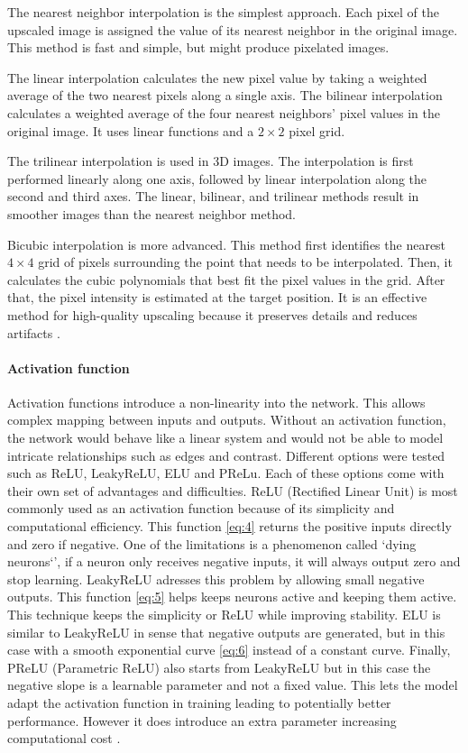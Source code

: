 \documentclass[twocolumn]{article}
\begin{document}
The nearest neighbor interpolation is the simplest approach. 
Each pixel of the upscaled image is assigned the value of its nearest neighbor in the original image. 
This method is fast and simple, but might produce pixelated images.

The linear interpolation calculates the new pixel value by taking a weighted average of the two nearest pixels along a single axis. 
The bilinear interpolation calculates a weighted average of the four nearest neighbors' pixel values in the original image. 
It uses linear functions and a $2 \times 2$ pixel grid. 

The trilinear interpolation is used in 3D images. 
The interpolation is first performed linearly along one axis, followed by linear interpolation along the second and third axes. 
The linear, bilinear, and trilinear methods result in smoother images than the nearest neighbor method.

Bicubic interpolation is more advanced. This method first identifies the nearest $4 \times 4$ grid of pixels surrounding the point that needs to be interpolated. 
Then, it calculates the cubic polynomials that best fit the pixel values in the grid. 
After that, the pixel intensity is estimated at the target position. 
It is an effective method for high-quality upscaling because it preserves details and reduces artifacts  \cite{unknown-author-2025} \cite{amanrao-2023}.

\paragraph{Activation function}
Activation functions introduce a non-linearity into the network. This allows complex mapping between inputs and outputs. 
Without an activation function, the network would behave like a linear system and would not be able to model intricate relationships such as edges and contrast. 
Different options were tested such as ReLU,  LeakyReLU, ELU and PReLu. Each of these options come with their own set of advantages and difficulties. 
ReLU (Rectified Linear Unit) is most commonly used as an activation function because of its simplicity and computational efficiency. 
This function \ref{eq:4} returns the positive inputs directly and zero if negative. One of the limitations is a phenomenon called `dying neurons`',  if a neuron only receives negative inputs, it will always output zero and stop learning.
LeakyReLU adresses this problem by allowing small negative outputs. This function \ref{eq:5} helps keeps neurons active and keeping them active. 
This technique keeps the simplicity or ReLU while improving stability. 
ELU is similar to LeakyReLU in sense that negative outputs are generated, but in this case with a smooth exponential curve \ref{eq:6}  instead of a constant curve. 
Finally, PReLU (Parametric ReLU) also starts from LeakyReLU but in this case the negative slope is a learnable parameter and not a fixed value. 
This lets the model adapt the activation function in training leading to potentially better performance. 
However it does introduce an extra parameter increasing computational cost \cite{bharatiya_2019_comprehensive}.
\end{document}
